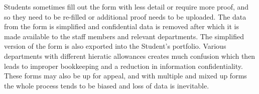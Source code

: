\documentclass[../main.tex]{subfiles}
\begin{document}
\raggedright
Students sometimes fill out the form with less detail or require more proof, and so they need to be re-filled or additional proof needs to be uploaded. The data from the form is simplified and confidential data is removed after which it is made available to the staff members and relevant departments. The simplified version of the form is also exported into the Student's portfolio. Various departments with different hieratic allowances creates much confusion which then leads to improper bookkeeping and a reduction in information confidentiality. These forms may also be up for appeal, and with multiple and mixed up forms the whole process tends to be biased and loss of data is inevitable. 
\end{document}
